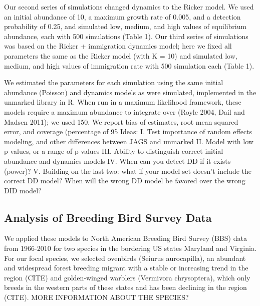 \documentclass[12pt]{article}
\begin{document}
Our second series of simulations changed dynamics to the
Ricker model.  We used an initial abundance of 10, a maximum
growth rate of 0.005, and a detection probability of 0.25, and
simulated low, medium, and high values of equilibrium
abundance, each with 500 simulations (Table 1).  Our third
series of simulations was based on the Ricker + immigration
dynamics model; here we fixed all parameters the same as the
Ricker model (with K = 10) and simulated low, medium, and high
values of immigration rate with 500 simulation each (Table
1).

We estimated the parameters for each simulation using the same
initial abundance (Poisson) and dynamics models as were
simulated, implemented in the unmarked library in R.  When run
in a maximum likelihood framework, these models require a
maximum abundance to integrate over (Royle 2004, Dail and
Madsen 2011); we used 150.  We report bias of estimates, root
mean squared error, and coverage (percentage of 95%
Ideas:
I.	Test importance of random effects modeling, and other differences between JAGS and unmarked
II.	Model with low p values, or a range of p values
III.	Ability to distinguish correct initial abundance and dynamics models
IV.	When can you detect DD if it exists (power)?
V.	Building on the last two: what if your model set doesn't
include the correct DD model?  When will the wrong DD model be favored
over the wrong DID model?



\subsection{Analysis of Breeding Bird Survey Data}

We applied these models to North American Breeding Bird Survey (BBS)
data from 1966-2010 for two species in the bordering US states
Maryland and Virginia.  For our focal species, we selected ovenbirds
(Seiurus aurocapilla), an abundant and widespread forest breeding
migrant with a stable or increasing trend in the region (CITE) and
golden-winged warblers (Vermivora chrysoptera), which only breeds in
the western parts of these states and has been declining in the region
(CITE).  MORE INFORMATION ABOUT THE SPECIES?
\end{document}
